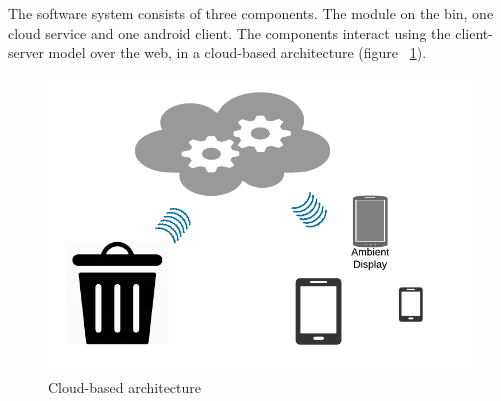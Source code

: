 The software system consists of three components. The module on the bin, one cloud service and one android client.
The components interact using the client-server model over the web, in a cloud-based architecture (figure ~\ref{fig:architecture}).

\begin{figure}
\centering
\includegraphics[scale=.6]{img/architecture}
\caption{Cloud-based architecture}
\label{fig:architecture}
\end{figure}

